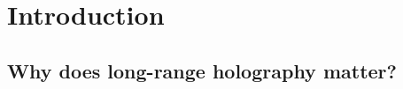\chapter{Introduction}
\label{ch:intro}





%
%

\section{Why does long-range holography matter?}

